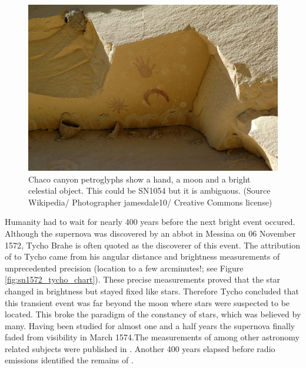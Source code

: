 \begin{figure}[htbp] %
   \centering
   \includegraphics[width=\textwidth]{chapter_intro/plots/Chaco_canyon_pueblo_bonito_petroglyphs.jpg} 
   \caption{Chaco canyon petroglyphs show a hand, a moon and a bright celestial object. This could be SN1054 but it is ambiguous. (Source Wikipedia/ Photographer jamesdale10/ Creative Commons license)}
   \label{fig:sn1006_chaco}
\end{figure}

Humanity had to wait for nearly 400 years before the next bright event occured. Although the supernova was discovered by an abbot in Messina on 06 November 1572, Tycho Brahe is often quoted as the discoverer of this event. The attribution of  to Tycho came from his angular distance and brightness measurements of unprecedented precision (location to a few arcminutes!; see Figure \ref{fig:sn1572_tycho_chart}). These precise measurements proved that the star changed in brightness but stayed fixed like stars. Therefore Tycho concluded that this transient event was far beyond the moon where stars were suspected to be located. This broke the paradigm of the constancy of stars, which was believed by many. Having been studied for almost one and a half years the supernova finally faded from visibility in March 1574.The measurements of  among other astronomy related subjects were published in \cite{1602QB41.B73.......}. Another 400 years elapsed before radio emissions identified the remains of  \citep{1952Natur.170..364H}.


